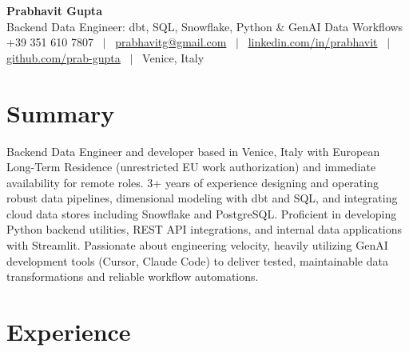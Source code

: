 \documentclass[a4paper,10pt]{article}
\begin{document}
\begin{minipage}[c]{0.80\textwidth}
 {\Huge\bfseries Prabhavit Gupta}\\[3pt]
 {\color{accent}\large Backend Data Engineer: dbt, SQL, Snowflake, Python \& GenAI Data Workflows}\\[6pt]
 {\footnotesize +39 351 610 7807 ~$\vert$~
 \href{mailto:prabhavitg@gmail.com}{prabhavitg@gmail.com} ~$\vert$~
 \href{https://www.linkedin.com/in/prabhavit/}{linkedin.com/in/prabhavit} ~$\vert$~
 \href{https://github.com/prab-gupta}{github.com/prab-gupta} ~$\vert$~
 Venice, Italy}
\end{minipage}\hfill

\section{Summary}
Backend Data Engineer and developer based in Venice, Italy with European Long-Term Residence (unrestricted EU work authorization) and immediate availability for remote roles. 3+ years of experience designing and operating robust data pipelines, dimensional modeling with dbt and SQL, and integrating cloud data stores including Snowflake and PostgreSQL. Proficient in developing Python backend utilities, REST API integrations, and internal data applications with Streamlit. Passionate about engineering velocity, heavily utilizing GenAI development tools (Cursor, Claude Code) to deliver tested, maintainable data transformations and reliable workflow automations.

\section{Experience}
\end{document}
